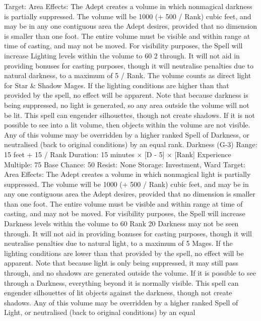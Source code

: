\documentclass[a4paper]{article}
\begin{document}
\begin{multicols}{3}
Target: Area
Effects: The Adept creates a volume in which nonmagical darkness is partially suppressed. The volume will be 1000 (+ 500 / Rank) cubic feet, and
may be in any one contiguous area the Adept desires, provided that no dimension is smaller than
one foot. The entire volume must be visible and
within range at time of casting, and may not be
moved. For visibility purposes, the Spell will increase Lighting levels within the volume to 60%
2%
through. It will not aid in providing bonuses for
casting purposes, though it will neutralise penalties
due to natural darkness, to a maximum of 5%
/ Rank. The volume counts as direct light for Star
& Shadow Mages. If the lighting conditions are
higher than that provided by the spell, no effect
will be apparent. Note that because darkness is
being suppressed, no light is generated, so any area
outside the volume will not be lit. This spell can
engender silhouettes, though not create shadows. If
it is not possible to see into a lit volume, then objects within the volume are not visible. Any of this
volume may be overridden by a higher ranked
Spell of Darkness, or neutralised (back to original
conditions) by an equal rank.
Darkness (G-3)
Range: 15 feet + 15 / Rank
Duration: 15 minutes × [D - 5] × [Rank]
Experience Multiple: 75
Base Chance: 50%
Resist: None
Storage: Investment, Ward
Target: Area
Effects: The Adept creates a volume in which nonmagical light is partially suppressed. The volume
will be 1000 (+ 500 / Rank) cubic feet, and may be
in any one contiguous area the Adept desires, provided that no dimension is smaller than one foot.
The entire volume must be visible and within range
at time of casting, and may not be moved. For
visibility purposes, the Spell will increase Darkness levels within the volume to 60%
Rank 20 Darkness may not be seen through. It will
not aid in providing bonuses for casting purposes,
though it will neutralise penalties due to natural
light, to a maximum of 5%
Mages. If the lighting conditions are lower than
that provided by the spell, no effect will be apparent. Note that because light is only being suppressed, it may still pass through, and no shadows
are generated outside the volume. If it is possible to
see through a Darkness, everything beyond it is
normally visible. This spell can engender silhouettes of lit objects against the darkness, though not
create shadows. Any of this volume may be overridden by a higher ranked Spell of Light, or neutralised (back to original conditions) by an equal

\end{multicols}
\end{document}
